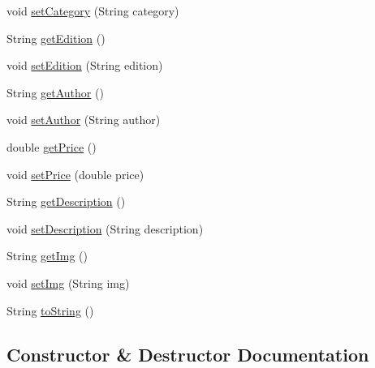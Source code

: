 \begin{DoxyCompactItemize}
\item 
void \hyperlink{classserver_1_1data_1_1_book_afac718f4a0738340cd39fa928672924c}{set\+Category} (String category)
\item 
String \hyperlink{classserver_1_1data_1_1_book_ad5bde468e4e453f38ecbc6deec70dd1f}{get\+Edition} ()
\item 
void \hyperlink{classserver_1_1data_1_1_book_a5b5aff00a34f6810bcd2741d00ac087a}{set\+Edition} (String edition)
\item 
String \hyperlink{classserver_1_1data_1_1_book_ae48ef2e01c143af71e24adcd9580337f}{get\+Author} ()
\item 
void \hyperlink{classserver_1_1data_1_1_book_a7d7e1dbd391d765d6d941e19a61ecae5}{set\+Author} (String author)
\item 
double \hyperlink{classserver_1_1data_1_1_book_aeafc0515d27d8e6d8403f852ab1ff0d0}{get\+Price} ()
\item 
void \hyperlink{classserver_1_1data_1_1_book_a7be7befe21ce4dd863538a0c4682a4db}{set\+Price} (double price)
\item 
String \hyperlink{classserver_1_1data_1_1_book_a4cb323c7591eb56ef4e660b54a972e7f}{get\+Description} ()
\item 
void \hyperlink{classserver_1_1data_1_1_book_abe0edd9bc6fb2f263d6df6873fede27c}{set\+Description} (String description)
\item 
String \hyperlink{classserver_1_1data_1_1_book_af9bd040112c4093a0eb998258e6a318a}{get\+Img} ()
\item 
void \hyperlink{classserver_1_1data_1_1_book_afb3d789fa8cbb8413ccd4189533af83b}{set\+Img} (String img)
\item 
String \hyperlink{classserver_1_1data_1_1_book_ae63b18e3c565ce684821eb4c42f4631c}{to\+String} ()
\end{DoxyCompactItemize}


\subsection{Constructor \& Destructor Documentation}
\mbox{\label{classserver_1_1data_1_1_book_aa625590266861f80eea48d26f979a483}} 
